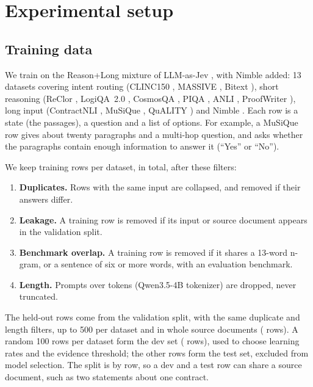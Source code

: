 \section{Experimental setup}
\label{sec:setup}

\subsection{Training data}
\label{sec:data}

We train on the Reason+Long mixture of LLM-as-Jev \citep{li2026llmasjev}, with Nimble added: 13 datasets covering intent routing (CLINC150 \citep{clinc150}, MASSIVE \citep{massive}, Bitext \citep{bitext}), short reasoning (ReClor \citep{reclor}, LogiQA~2.0 \citep{logiqa2}, CosmosQA \citep{cosmosqa}, PIQA \citep{piqa}, ANLI \citep{anli}, ProofWriter \citep{proofwriter}), long input (ContractNLI \citep{contractnli}, MuSiQue \citep{musique}, QuALITY \citep{quality}) and Nimble \citep{nimble}.
Each row is a state (the passages), a question and a list of options.
For example, a MuSiQue row gives about twenty paragraphs and a multi-hop question, and asks whether the paragraphs contain enough information to answer it (``Yes'' or ``No'').

We keep \NPerDataset{} training rows per dataset, \NTrain{} in total, after these filters:
\begin{enumerate}\setlength{\itemsep}{0pt}\setlength{\topsep}{2pt}
  \item \textbf{Duplicates.} Rows with the same input are collapsed, and removed if their answers differ.
  \item \textbf{Leakage.} A training row is removed if its input or source document appears in the validation split.
  \item \textbf{Benchmark overlap.} A training row is removed if it shares a 13-word n-gram, or a sentence of six or more words, with an evaluation benchmark.
  \item \textbf{Length.} Prompts over \MaxTokens{} tokens (Qwen3.5-4B tokenizer) are dropped, never truncated.
\end{enumerate}

The held-out rows come from the validation split, with the same duplicate and length filters, up to 500 per dataset and in whole source documents (\NHeldOut{} rows).
A random 100 rows per dataset form the dev set (\NDev{} rows), used to choose learning rates and the evidence threshold; the other \NTest{} rows form the test set, excluded from model selection.
The split is by row, so a dev and a test row can share a source document, such as two statements about one contract.

